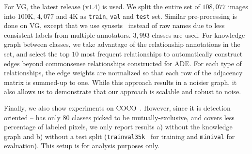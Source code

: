 \documentclass[10pt,twocolumn,letterpaper]{article}
\begin{document}
For VG, the latest release (v$1.4$) is used. We split the entire set of $108,077$ images into $100$K, $4,077$ and $4$K as {\tt train}, {\tt val} and {\tt test} set. Similar pre-processing is done on VG, except that we use synsets~\cite{russakovsky2015imagenet} instead of raw names due to less consistent labels from multiple annotators. $3,993$ classes are used. For knowledge graph between classes, we take advantage of the relationship annotations in the set, and select the top $10$ most frequent relationships to automatically construct edges beyond commonsense relationships constructed for ADE. For each type of relationships, the edge weights are normalized so that each row of the adjacency matrix is summed-up to one. While this approach results in a noisier graph, it also allows us to demonstrate that our approach is scalable and robust to noise.

Finally, we also show experiments on COCO~\cite{lin2014microsoft}. However, since it is detection oriented -- has only $80$ classes picked to be mutually-exclusive, and covers less percentage of labeled pixels, we only report results a) without the knowledge graph and b) without a test split ({\tt trainval35k}~\cite{chen2017spatial} for training and {\tt minival} for evaluation). This setup is for analysis purposes only.
\end{document}
